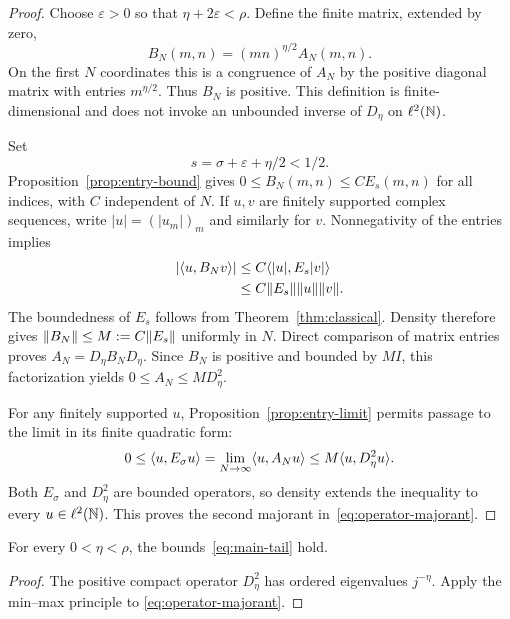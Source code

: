 \begin{proof}
Choose $\varepsilon>0$ so that $\eta+2\varepsilon<\rho$.
Define the finite matrix, extended by zero,
\begin{equation}
 B_N(m,n)=(mn)^{\eta/2}A_N(m,n).
 \label{eq:BN}
\end{equation}
On the first $N$ coordinates this is a congruence of $A_N$ by
the positive diagonal matrix with entries $m^{\eta/2}$. Thus
$B_N$ is positive. This definition is finite-dimensional and does
not invoke an unbounded inverse of $D_\eta$ on $\ell^2(\mathbb N)$.

Set
\begin{equation}
 s=\sigma+\varepsilon+\eta/2<1/2.
 \label{eq:shift}
\end{equation}
Proposition~\ref{prop:entry-bound} gives
$0\le B_N(m,n)\le C E_s(m,n)$ for all indices, with $C$
independent of $N$. If $u,v$ are finitely supported complex sequences,
write $|u|=(|u_m|)_m$ and similarly for $v$. Nonnegativity of the
entries implies
\begin{align}
 |\langle u,B_Nv\rangle|
 &\le C\langle|u|,E_s|v|\rangle\notag\\
 &\le C\lVert E_s\rVert\lVert u\rVert\lVert v\rVert.
 \label{eq:bilinear}
\end{align}
The boundedness of $E_s$ follows from Theorem~\ref{thm:classical}.
Density therefore gives $\lVert B_N\rVert\le M:=C\lVert E_s\rVert$
uniformly in $N$. Direct comparison of matrix entries proves
$A_N=D_\eta B_ND_\eta$. Since $B_N$ is positive and bounded by
$M I$, this factorization yields $0\le A_N\le M D_\eta^2$.

For any finitely supported $u$, Proposition~\ref{prop:entry-limit}
permits passage to the limit in its finite quadratic form:
\[
 0\le\langle u,E_\sigma u\rangle
 =\lim_{N\to\infty}\langle u,A_Nu\rangle
 \le M\langle u,D_\eta^2u\rangle.
\]
Both $E_\sigma$ and $D_\eta^2$ are bounded operators, so density
extends the inequality to every $u\in\ell^2(\mathbb N)$. This proves the
second majorant in~\eqref{eq:operator-majorant}.
\end{proof}

\begin{corollary}
\label{cor:tails}
For every $0<\eta<\rho$, the bounds~\eqref{eq:main-tail} hold.
\end{corollary}

\begin{proof}
The positive compact operator $D_\eta^2$ has ordered eigenvalues
$j^{-\eta}$. Apply the min--max principle to
\eqref{eq:operator-majorant}.
\end{proof}

